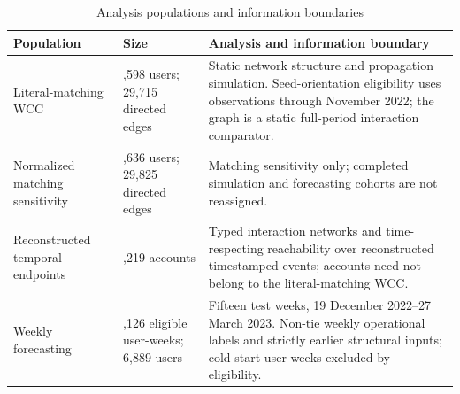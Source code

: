 \begin{table}[htbp]
\centering\small
\caption{Analysis populations and information boundaries}\label{tab:populations}
\begin{tabular}{>{\raggedright\arraybackslash}p{3.1cm}>{\raggedright\arraybackslash}p{2.4cm}>{\raggedright\arraybackslash}p{6.8cm}}\toprule Population & Size & Analysis and information boundary\\\midrule
Literal-matching WCC & 17,598 users; 29,715 directed edges & Static network structure and propagation simulation. Seed-orientation eligibility uses observations through November 2022; the graph is a static full-period interaction comparator.\\
Normalized matching sensitivity & 17,636 users; 29,825 directed edges & Matching sensitivity only; completed simulation and forecasting cohorts are not reassigned.\\
Reconstructed temporal endpoints & 60,219 accounts & Typed interaction networks and time-respecting reachability over reconstructed timestamped events; accounts need not belong to the literal-matching WCC.\\
Weekly forecasting & 12,126 eligible user-weeks; 6,889 users & Fifteen test weeks, 19 December 2022--27 March 2023. Non-tie weekly operational labels and strictly earlier structural inputs; cold-start user-weeks excluded by eligibility.\\
\bottomrule\end{tabular}
\end{table}
